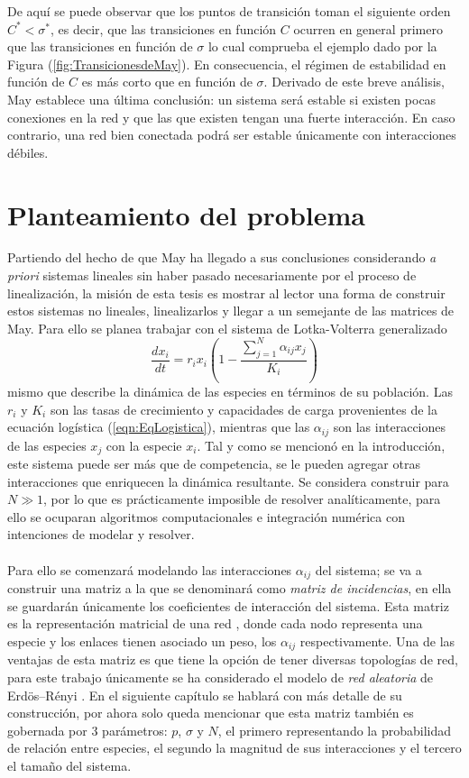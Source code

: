 De aquí se puede observar que los puntos de transición toman el siguiente orden $C^*<\sigma^*$, es decir, que las transiciones en función $C$ ocurren en general primero que las transiciones en función de $\sigma$ lo cual comprueba el ejemplo dado por la Figura (\ref{fig:TransicionesdeMay}). En consecuencia, el régimen de estabilidad en función de $C$ es más corto que en función de $\sigma$. Derivado de este breve análisis, May establece una última conclusión: un sistema será estable si existen pocas conexiones en la red y que las que existen tengan una fuerte interacción. En caso contrario, una red bien conectada podrá ser estable únicamente con interacciones débiles.
\newpage
\section{Planteamiento del problema}
Partiendo del hecho de que May ha llegado a sus conclusiones considerando \textit{a priori} sistemas lineales sin haber pasado necesariamente por el proceso de linealización, la misión de esta tesis es mostrar al lector una forma de construir estos sistemas no lineales, linealizarlos y llegar a un semejante de las matrices de May. Para ello se planea trabajar con el sistema de Lotka-Volterra generalizado \cite{may2007theoretical}
$$\frac{dx_i}{dt}=r_ix_i\left(1-\frac{\sum_{j=1}^N \alpha_{ij}x_j}{K_i}\right)$$
mismo que describe la dinámica de las especies en términos de su población. Las $r_i$ y $K_i$ son las tasas de crecimiento y capacidades de carga provenientes de la ecuación logística (\ref{eqn:EqLogistica}), mientras que las $\alpha_{ij}$ son las interacciones de las especies $x_j$ con la especie $x_i$. Tal y como se mencionó en la introducción, este sistema puede ser más que de competencia, se le pueden agregar otras interacciones que enriquecen la dinámica resultante. Se considera construir para $N\gg 1$, por lo que es prácticamente imposible de resolver analíticamente, para ello se ocuparan algoritmos computacionales e integración numérica con intenciones de modelar y resolver. \\
\\
Para ello se comenzará modelando las interacciones $\alpha_{ij}$ del sistema; se va a construir una matriz a la que se denominará como \textit{matriz de incidencias}, en ella se guardarán únicamente los coeficientes de interacción del sistema. Esta matriz es la representación matricial de una red \cite{newman2018networks}, donde cada nodo representa una especie y los enlaces tienen asociado un peso, los $\alpha_{ij}$ respectivamente. Una de las ventajas de esta matriz es que tiene la opción de tener diversas topologías de red, para este trabajo únicamente se ha considerado el modelo de \textit{red aleatoria} de Erdös–Rényi \cite{posfai2016network}. En el siguiente capítulo se hablará con más detalle de su construcción, por ahora solo queda mencionar que esta matriz también es gobernada por 3 parámetros: $p$, $\sigma$ y $N$, el primero representando la probabilidad de relación entre especies, el segundo la magnitud de sus interacciones y el tercero el tamaño del sistema. \\
